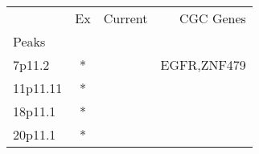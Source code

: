 \begin{tabular}{lccr}
\toprule
{} & Ex & Current &    CGC Genes \\
Peaks    &    &         &              \\
\midrule
7p11.2   &  * &         &  EGFR,ZNF479 \\
11p11.11 &  * &         &              \\
18p11.1  &  * &         &              \\
20p11.1  &  * &         &              \\
\bottomrule
\end{tabular}
